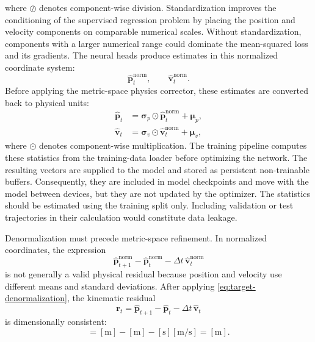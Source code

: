 \documentclass[11pt,a4paper]{article}
\begin{document}
where $\oslash$ denotes component-wise division. Standardization improves the conditioning of the supervised regression problem by placing the position and velocity components on comparable numerical scales. Without standardization, components with a larger numerical range could dominate the mean-squared loss and its gradients. The neural heads produce estimates in this normalized coordinate system: 
\begin{equation} 
	\widehat{\mathbf p}_t^{\mathrm{norm}}, \qquad \widehat{\mathbf v}_t^{\mathrm{norm}}. 
\end{equation} 
Before applying the metric-space physics corrector, these estimates are converted back to physical units: 
\begin{align} 
	\widehat{\mathbf p}_t &= \boldsymbol{\sigma}_p \odot \widehat{\mathbf p}_t^{\mathrm{norm}} + \boldsymbol{\mu}_p, \\
	\widehat{\mathbf v}_t &= \boldsymbol{\sigma}_v \odot \widehat{\mathbf v}_t^{\mathrm{norm}} + \boldsymbol{\mu}_v, \label{eq:target-denormalization} 
\end{align} 
where $\odot$ denotes component-wise multiplication. The training pipeline computes these statistics from the training-data loader before optimizing the network. The resulting vectors are supplied to the model and stored as persistent non-trainable buffers. Consequently, they are included in model checkpoints and move with the model between devices, but they are not updated by the optimizer. The statistics should be estimated using the training split only. Including validation or test trajectories in their calculation would constitute data leakage. 

Denormalization must precede metric-space refinement. In normalized coordinates, the expression 
\begin{equation} 
	\widehat{\mathbf p}_{t+1}^{\mathrm{norm}} - \widehat{\mathbf p}_{t}^{\mathrm{norm}} - \Delta t\, \widehat{\mathbf v}_{t}^{\mathrm{norm}} 
\end{equation} 
is not generally a valid physical residual because position and velocity use different means and standard deviations. After applying \eqref{eq:target-denormalization}, the kinematic residual 
\begin{equation} 
	\mathbf r_t = \widehat{\mathbf p}_{t+1} - \widehat{\mathbf p}_{t} - \Delta t\, \widehat{\mathbf v}_{t} 
\end{equation} 
is dimensionally consistent: 
\begin{equation} 
	[\mathbf r_t] = [\mathrm{m}] - [\mathrm{m}] - [\mathrm{s}][\mathrm{m/s}] = [\mathrm{m}]. 
\end{equation}
\end{document}
